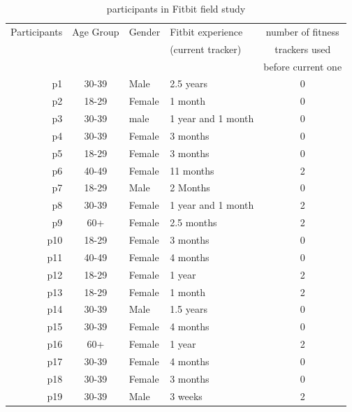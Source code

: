 \documentclass[12pt,oneside]{book}
\begin{document}
\begin{table} 
\begin{center}
\begin{tabular}{|r|c|l|l|c|}
\hline
 Participants   &  Age Group  &  Gender   & Fitbit experience  &   number of fitness   \\
  & & & (current tracker) & trackers used  \\
  & & & & before current one\\
 \hline
p1	& 30-39	& Male	& 2.5 years	& 0 \\
p2	& 18-29	& Female	& 1 month 	& 0 \\
p3	& 30-39	& male	& 1 year and 1 month	& 0 \\
p4	& 30-39	& Female	& 3 months	& 0 \\
p5	& 18-29	& Female	& 3 months 	& 0 \\
p6	& 40-49	& Female	& 11 months	& 2 \\
p7	& 18-29	& Male	& 2 Months	& 0 \\ 
p8	& 30-39	& Female	& 1 year and 1 month	& 2 \\
p9	& 60+	& Female	& 2.5 months	& 2 \\
p10	& 18-29	& Female	& 3 months	& 0 \\
p11	& 40-49	& Female	& 4 months	& 0 \\
p12	& 18-29	& Female	& 1 year	& 2 \\
p13	& 18-29	& Female	& 1 month	& 2 \\ 
p14	& 30-39	& Male	& 1.5 years	& 0 \\
p15	& 30-39	& Female	& 4 months	& 0 \\
p16	& 60+	& Female	& 1 year	& 2 \\
p17	& 30-39	& Female	& 4 months	& 0 \\
p18	& 30-39	& Female	& 3 months	& 0 \\
p19	& 30-39	& Male	& 3 weeks	& 2\\
\hline
\end{tabular}
\caption{participants in Fitbit field study}
\label{table:participants}

\end{center}
\end{table}
\end{document}
